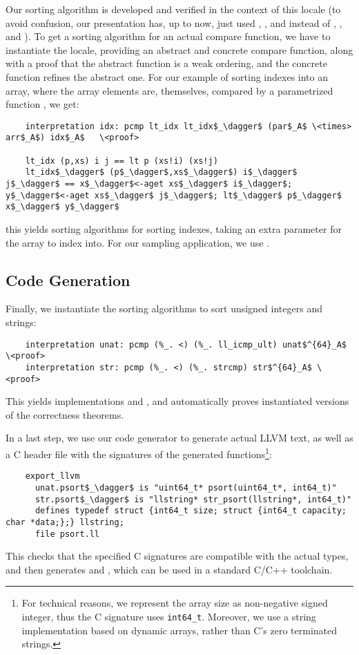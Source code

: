 \documentclass[a4paper,UKenglish,cleveref, autoref, thm-restate]{lipics-v2021}
\begin{document}
  Our sorting algorithm is developed and verified in the context of this locale (to avoid confusion, our presentation has, up to now, just used \is{<}, \is{<=}, and  instead of , , and ).
  To get a sorting algorithm for an actual compare function, we have to instantiate the locale,
  providing an abstract and concrete compare function, along with a proof that the abstract function is a weak ordering,
  and the concrete function refines the abstract one. For our example of sorting indexes into an array,
  where the array elements are, themselves, compared by a parametrized function , we get:
  \begin{lstlisting}
    interpretation idx: pcmp lt_idx lt_idx$_\dagger$ (par$_A$ \<times> arr$_A$) idx$_A$   \<proof>

    lt_idx (p,xs) i j == lt p (xs!i) (xs!j)
    lt_idx$_\dagger$ (p$_\dagger$,xs$_\dagger$) i$_\dagger$ j$_\dagger$ == x$_\dagger$<-aget xs$_\dagger$ i$_\dagger$; y$_\dagger$<-aget xs$_\dagger$ j$_\dagger$; lt$_\dagger$ p$_\dagger$ x$_\dagger$ y$_\dagger$
  \end{lstlisting}
  this yields sorting algorithms for sorting indexes, taking an extra parameter for the array to index into.
  For our sampling application, we use .

  \subsection{Code Generation}
  Finally, we instantiate the sorting algorithms to sort unsigned integers and strings:
  \begin{lstlisting}
    interpretation unat: pcmp (%_. <) (%_. ll_icmp_ult) unat$^{64}_A$ \<proof>
    interpretation str: pcmp (%_. <) (%_. strcmp) str$^{64}_A$ \<proof>
  \end{lstlisting}
  This yields implementations  and , and automatically
  proves instantiated versions of the correctness theorems.

  In a last step, we use our code generator to generate actual LLVM text, as well as a C header file with the
  signatures of the generated functions\footnote{
    For technical reasons, we represent the array size as non-negative signed integer, thus the C signature uses \lstinline[language=C]{int64_t}.
    Moreover, we use a string implementation based on dynamic arrays, rather than C's zero terminated strings.
  }:
  \begin{lstlisting}
    export_llvm
      unat.psort$_\dagger$ is "uint64_t* psort(uint64_t*, int64_t)"
      str.psort$_\dagger$ is "llstring* str_psort(llstring*, int64_t)"
      defines typedef struct {int64_t size; struct {int64_t capacity; char *data;};} llstring;
      file psort.ll
  \end{lstlisting}
  This checks that the specified C signatures are compatible with the actual types, and then
  generates  and , which can be used in a standard C/C++ toolchain.
\end{document}
